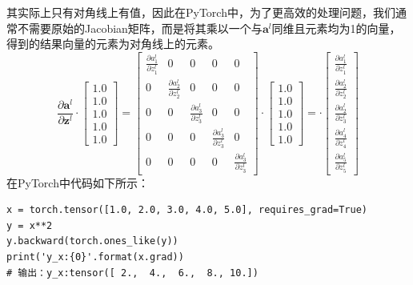 \documentclass[UTF8]{article}
\begin{document}
其实际上只有对角线上有值，因此在PyTorch中，为了更高效的处理问题，我们通常不需要原始的Jacobian矩阵，而是将其乘以一个与$\boldsymbol{a}^{l}$同维且元素均为1的向量，得到的结果向量的元素为对角线上的元素。
\begin{equation}
\frac{ \partial{\boldsymbol{a}^{l}} }{ \partial{\boldsymbol{z}^{l}} } \cdot \begin{bmatrix}
1.0 \\
1.0 \\
1.0 \\
1.0 \\
1.0
\end{bmatrix}=\begin{bmatrix}
\frac{ \partial{a}_{1}^{l} }{ \partial{z}_{1}^{l} } & 0 & 0 & 0 & 0 \\
0 & \frac{ \partial{a}_{2}^{l} }{ \partial{z}_{2}^{l} }  & 0 & 0 & 0 \\
0 & 0 & \frac{ \partial{a}_{3}^{l} }{ \partial{z}_{3}^{l} }  & 0 & 0 \\
0 & 0 & 0 & \frac{ \partial{a}_{3}^{l} }{ \partial{z}_{3}^{l} }  & 0 \\
0 & 0 & 0 & 0 & \frac{ \partial{a}_{3}^{l} }{ \partial{z}_{3}^{l} } 
\end{bmatrix} \cdot \begin{bmatrix}
1.0 \\
1.0 \\
1.0 \\
1.0 \\
1.0
\end{bmatrix}= \cdot \begin{bmatrix}
\frac{ \partial{a}_{1}^{l} }{ \partial{z}_{1}^{l} } \\
\frac{ \partial{a}_{2}^{l} }{ \partial{z}_{2}^{l} } \\
\frac{ \partial{a}_{2}^{l} }{ \partial{z}_{3}^{l} } \\
\frac{ \partial{a}_{4}^{l} }{ \partial{z}_{4}^{l} } \\
\frac{ \partial{a}_{5}^{l} }{ \partial{z}_{5}^{l} } 
\end{bmatrix}
\label{autodif-vector-vector-gradient-simplify}
\end{equation}
在PyTorch中代码如下所示：
\begin{lstlisting}
x = torch.tensor([1.0, 2.0, 3.0, 4.0, 5.0], requires_grad=True)
y = x**2
y.backward(torch.ones_like(y))
print('y_x:{0}'.format(x.grad))
# 输出：y_x:tensor([ 2.,  4.,  6.,  8., 10.])
\end{lstlisting}
\end{document}
